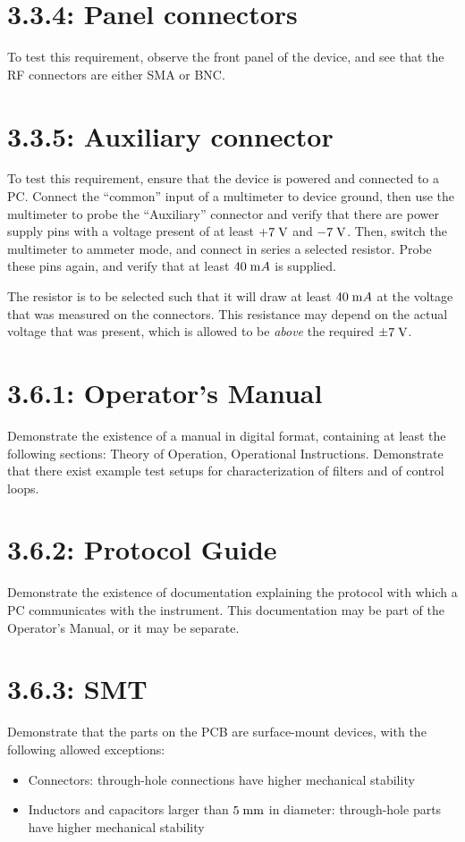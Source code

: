 \section*{3.3.4: Panel connectors}
To test this requirement, observe the front panel of the device, and see that the RF connectors are either
SMA or BNC.

\section*{3.3.5: Auxiliary connector}
To test this requirement, ensure that the device is powered and connected to a PC. Connect the
``common'' input of a multimeter to device ground, then use the multimeter to probe the ``Auxiliary'' connector
and verify that there are power supply pins with a voltage present of at least $+7\;\mathrm{V}$ and
$-7\;\mathrm{V}$. Then, switch the multimeter to ammeter mode, and connect in series a selected resistor. Probe
these pins again, and verify that at least $40\;\mathrm{m}A$ is supplied.

The resistor is to be selected such that it will draw at least $40\;\mathrm{m}A$ at the voltage that was
measured on the connectors. This resistance may depend on the actual voltage that was present,
which is allowed to be \emph{above} the required $\pm 7\;\mathrm{V}$.

\section*{3.6.1: Operator's Manual}
Demonstrate the existence of a manual in digital format, containing at least the following
sections: Theory of Operation, Operational Instructions. Demonstrate that there exist example
test setups for characterization of filters and of control loops.

\section*{3.6.2: Protocol Guide}
Demonstrate the existence of documentation explaining the protocol with which a PC communicates with the
instrument. This documentation may be part of the Operator's Manual, or it may be separate.

\section*{3.6.3: SMT}
Demonstrate that the parts on the PCB are surface-mount devices, with the following allowed
exceptions:
\begin{itemize}
\item{Connectors: through-hole connections have higher mechanical stability}
\item{Inductors and capacitors larger than $5\;\mathrm{mm}$ in diameter: through-hole parts have higher mechanical stability}
\end{itemize}

